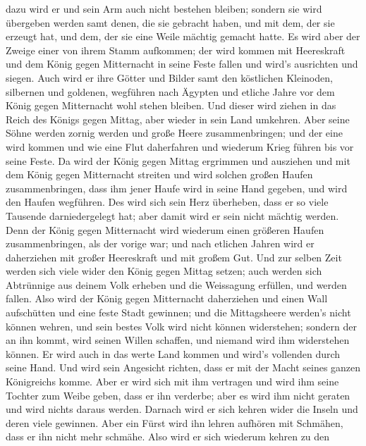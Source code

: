 dazu wird er und sein Arm auch nicht bestehen bleiben; sondern sie wird
übergeben werden samt denen, die sie gebracht haben, und mit dem, der
sie erzeugt hat, und dem, der sie eine Weile mächtig gemacht hatte.
 Es wird aber der Zweige einer von ihrem Stamm aufkommen;
der wird kommen mit Heereskraft und dem König gegen Mitternacht in seine
Feste fallen und wird's ausrichten und siegen.  Auch wird
er ihre Götter und Bilder samt den köstlichen Kleinoden, silbernen und
goldenen, wegführen nach Ägypten und etliche Jahre vor dem König gegen
Mitternacht wohl stehen bleiben.  Und dieser wird ziehen
in das Reich des Königs gegen Mittag, aber wieder in sein Land umkehren.
 Aber seine Söhne werden zornig werden und große Heere
zusammenbringen; und der eine wird kommen und wie eine Flut daherfahren
und wiederum Krieg führen bis vor seine Feste.  Da wird
der König gegen Mittag ergrimmen und ausziehen und mit dem König gegen
Mitternacht streiten und wird solchen großen Haufen zusammenbringen,
dass ihm jener Haufe wird in seine Hand gegeben,  und
wird den Haufen wegführen. Des wird sich sein Herz überheben, dass er so
viele Tausende darniedergelegt hat; aber damit wird er sein nicht
mächtig werden.  Denn der König gegen Mitternacht wird
wiederum einen größeren Haufen zusammenbringen, als der vorige war; und
nach etlichen Jahren wird er daherziehen mit großer Heereskraft und mit
großem Gut.  Und zur selben Zeit werden sich viele wider
den König gegen Mittag setzen; auch werden sich Abtrünnige aus deinem
Volk erheben und die Weissagung erfüllen, und werden fallen.
 Also wird der König gegen Mitternacht daherziehen und
einen Wall aufschütten und eine feste Stadt gewinnen; und die
Mittagsheere werden's nicht können wehren, und sein bestes Volk wird
nicht können widerstehen;  sondern der an ihn kommt, wird
seinen Willen schaffen, und niemand wird ihm widerstehen können. Er wird
auch in das werte Land kommen und wird's vollenden durch seine Hand.
 Und wird sein Angesicht richten, dass er mit der Macht
seines ganzen Königreichs komme. Aber er wird sich mit ihm vertragen und
wird ihm seine Tochter zum Weibe geben, dass er ihn verderbe; aber es
wird ihm nicht geraten und wird nichts daraus werden. 
Darnach wird er sich kehren wider die Inseln und deren viele gewinnen.
Aber ein Fürst wird ihn lehren aufhören mit Schmähen, dass er ihn nicht
mehr schmähe.  Also wird er sich wiederum kehren zu den
